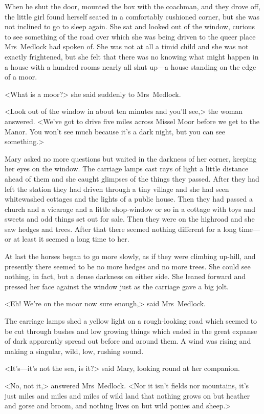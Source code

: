 When he shut the door, mounted the box with the coachman, and they drove off, the little girl found herself seated in a comfortably cushioned corner, but she was not inclined to go to sleep again. She sat and looked out of the window, curious to see something of the road over which she was being driven to the queer place Mrs~Medlock had spoken of. She was not at all a timid child and she was not exactly frightened, but she felt that there was no knowing what might happen in a house with a hundred rooms nearly all shut up—a house standing on the edge of a moor.

<What is a moor?> she said suddenly to Mrs~Medlock.

<Look out of the window in about ten minutes and you'll see,> the woman answered. <We've got to drive five miles across Missel Moor before we get to the Manor. You won't see much because it's a dark night, but you can see something.>

Mary asked no more questions but waited in the darkness of her corner, keeping her eyes on the window. The carriage lamps cast rays of light a little distance ahead of them and she caught glimpses of the things they passed. After they had left the station they had driven through a tiny village and she had seen whitewashed cottages and the lights of a public house. Then they had passed a church and a vicarage and a little shop-window or so in a cottage with toys and sweets and odd things set out for sale. Then they were on the highroad and she saw hedges and trees. After that there seemed nothing different for a long time—or at least it seemed a long time to her.

At last the horses began to go more slowly, as if they were climbing up-hill, and presently there seemed to be no more hedges and no more trees. She could see nothing, in fact, but a dense darkness on either side. She leaned forward and pressed her face against the window just as the carriage gave a big jolt.

<Eh! We're on the moor now sure enough,> said Mrs~Medlock.

The carriage lamps shed a yellow light on a rough-looking road which seemed to be cut through bushes and low growing things which ended in the great expanse of dark apparently spread out before and around them. A wind was rising and making a singular, wild, low, rushing sound.

<It's—it's not the sea, is it?> said Mary, looking round at her companion.

<No, not it,> answered Mrs~Medlock. <Nor it isn't fields nor mountains, it's just miles and miles and miles of wild land that nothing grows on but heather and gorse and broom, and nothing lives on but wild ponies and sheep.>

